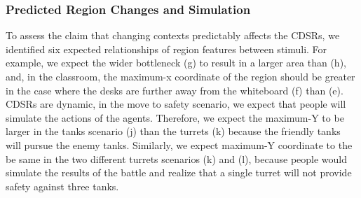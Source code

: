\documentclass[11pt,letterpaper]{article}
\begin{document}

\subsubsection{Predicted Region Changes and Simulation}
\label{sec:simulation}
To assess the claim that changing contexts predictably affects the CDSRs, we identified six expected relationships of region features between stimuli.  For example, we expect the wider bottleneck (g) to result in a larger area than (h), and, in the classroom, the maximum-x coordinate of the region should be greater in the case where the desks are further away from the whiteboard (f) than (e).  CDSRs are dynamic, in the move to safety scenario, we expect that people will simulate the actions of the agents.  Therefore, we expect the maximum-Y to be larger in the tanks scenario (j) than the turrets (k) because the friendly tanks will pursue the enemy tanks.  Similarly, we expect maximum-Y coordinate to the be same in the two different turrets scenarios (k) and (l), because people would simulate the results of the battle and realize that a single turret will not provide safety against three tanks.  
\end{document}

